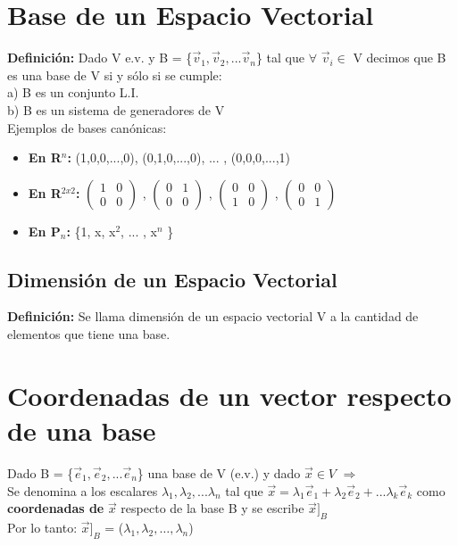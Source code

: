 \documentclass[11pt]{article}
\begin{document}
\section{Base de un Espacio Vectorial}
{\bfseries Definición:} Dado V e.v. y B = \{$\vec{v}_{1}, \vec{v}_2,... \vec{v}_n $\} tal que $\forall$ $\vec{v}_{i} \in$ V decimos que B es una base de V si y sólo si se cumple:\\
a) B es un conjunto L.I.\\
b) B es un sistema de generadores de V \\
Ejemplos de bases canónicas: 
\begin{itemize}
\item {\bfseries En R$^{n}$:} (1,0,0,...,0), (0,1,0,...,0), ... , (0,0,0,...,1) 
\item {\bfseries En R$^{2x2}$:} $\begin{pmatrix} 1&0\\ 0&0 \end{pmatrix}$ , $\begin{pmatrix} 0&1\\ 0&0 \end{pmatrix}$ , $\begin{pmatrix} 0&0\\ 1&0 \end{pmatrix}$ , $\begin{pmatrix} 0&0\\ 0&1 \end{pmatrix}$ 
\item {\bfseries En P$_{n}$:} \{1, x, x$^2$, ... , x$^n$ \} 
\end{itemize}
\subsection{Dimensión de un Espacio Vectorial}
{\bfseries Definición:} Se llama dimensión de un espacio vectorial V a la cantidad de elementos que tiene una base.
\section{Coordenadas de un vector respecto de una base}
Dado B = \{$\vec{e}_{1}, \vec{e}_2,... \vec{e}_n $\} una base de V (e.v.) y dado $\vec{x} \in V$ $\Rightarrow$\\ 
Se denomina a los escalares $\lambda_{1}, \lambda_{2},... \lambda_{n}$ tal que $\vec{x} = \lambda_{1}\vec{e}_{1} + \lambda_{2}\vec{e}_{2} +... \lambda_{k}\vec{e}_{k}$ como {\bfseries coordenadas de} $\vec{x} $ respecto de la base B y se escribe $\vec{x}]_B$ \\
Por lo tanto: $\vec{x}]_B$ = ($\lambda_{1}, \lambda_{2},\hdots, \lambda_{n}$)
\newpage
\end{document}
